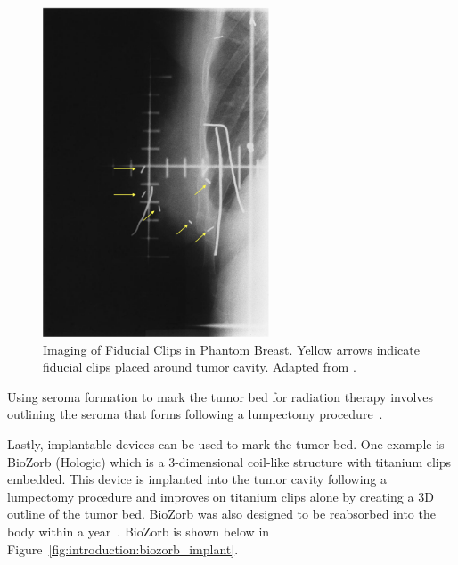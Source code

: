 \begin{figure}[h!]
        \centering
        \includegraphics[width=0.6\textwidth]{../figs/introduction/imaging_of_fiducal_clips_in_phantom_breast.png}
        \caption{Imaging of Fiducial Clips in Phantom Breast. Yellow arrows indicate fiducial clips placed around tumor cavity. Adapted from \cite{RefWorks:RefID:178-krawczyk1994importance}.}
        \label{fig:introduction:imaging_of_fiducal_clips_in_phantom_breast}
\end{figure}

Using seroma formation to mark the tumor bed for radiation therapy involves outlining the seroma that forms following a lumpectomy procedure~\cite{RefWorks:RefID:25-acree2022review}.

Lastly, implantable devices can be used to mark the tumor bed. One example is BioZorb (Hologic) which is a 3-dimensional coil-like structure with titanium clips embedded. This device is implanted into the tumor cavity following a lumpectomy procedure and improves on titanium clips alone by creating a 3D outline of the tumor bed. BioZorb was also designed to be reabsorbed into the body within a year~\cite{RefWorks:RefID:25-acree2022review}. BioZorb is shown below in Figure~\ref{fig:introduction:biozorb_implant}.

